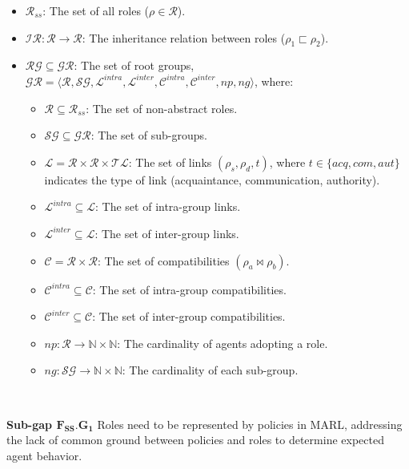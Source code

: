 \documentclass[conference]{IEEEtran}
\newcounter{relation}
\begin{document}
\begin{itemize}
    \item $\mathcal{R}_{ss}$: The set of all roles ($\rho \in \mathcal{R}$).
    \item $\mathcal{IR}: \mathcal{R} \rightarrow \mathcal{R}$: The inheritance relation between roles ($\rho_1 \sqsubset \rho_2$).
    \item $\mathcal{RG} \subseteq \mathcal{GR}$: The set of root groups, $\mathcal{GR} = \langle \mathcal{R}, \mathcal{SG}, \mathcal{L}^{intra}, \mathcal{L}^{inter}, \mathcal{C}^{intra}, \mathcal{C}^{inter}, np, ng \rangle$, where:
          \begin{itemize}
              \item $\mathcal{R} \subseteq \mathcal{R}_{ss}$: The set of non-abstract roles.
              \item $\mathcal{SG} \subseteq \mathcal{GR}$: The set of sub-groups.
              \item $\mathcal{L} = \mathcal{R} \times \mathcal{R} \times \mathcal{TL}$: The set of links $(\rho_s, \rho_d, t)$, where $t \in \{acq, com, aut\}$ indicates the type of link (acquaintance, communication, authority).
              \item $\mathcal{L}^{intra} \subseteq \mathcal{L}$: The set of intra-group links.
              \item $\mathcal{L}^{inter} \subseteq \mathcal{L}$: The set of inter-group links.
              \item $\mathcal{C} = \mathcal{R} \times \mathcal{R}$: The set of compatibilities $(\rho_a \bowtie \rho_b)$.
              \item $\mathcal{C}^{intra} \subseteq \mathcal{C}$: The set of intra-group compatibilities.
              \item $\mathcal{C}^{inter} \subseteq \mathcal{C}$: The set of inter-group compatibilities.
              \item $np: \mathcal{R} \rightarrow \mathbb{N} \times \mathbb{N}$: The cardinality of agents adopting a role.
              \item $ng: \mathcal{SG} \rightarrow \mathbb{N} \times \mathbb{N}$: The cardinality of each sub-group.
          \end{itemize}
\end{itemize}

\

\textbf{Sub-gap $\mathbf{F_{SS}.G_1}$} \quad Roles need to be represented by policies in MARL, addressing the lack of common ground between policies and roles to determine expected agent behavior.
\end{document}
